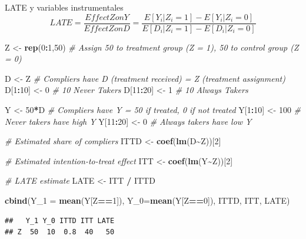 \documentclass[
  ignorenonframetext,
]{beamer}
\newenvironment{Shaded}{\begin{snugshade}}{\end{snugshade}}
\newcommand{\CommentTok}[1]{\textcolor[rgb]{0.56,0.35,0.01}{\textit{#1}}}
\newcommand{\DataTypeTok}[1]{\textcolor[rgb]{0.13,0.29,0.53}{#1}}
\newcommand{\DecValTok}[1]{\textcolor[rgb]{0.00,0.00,0.81}{#1}}
\newcommand{\KeywordTok}[1]{\textcolor[rgb]{0.13,0.29,0.53}{\textbf{#1}}}
\newcommand{\NormalTok}[1]{#1}
\newcommand{\OperatorTok}[1]{\textcolor[rgb]{0.81,0.36,0.00}{\textbf{#1}}}
\newcommand{\StringTok}[1]{\textcolor[rgb]{0.31,0.60,0.02}{#1}}
\begin{document}
\begin{frame}[fragile]{LATE y variables instrumentales}
\protect\hypertarget{late-y-variables-instrumentales-1}{}
\[LATE = \frac{EffectZonY}{EffectZonD} = \frac{E[Y_i|Z_i=1]-E[Y_i|Z_i=0]}{E[D_i|Z_i=1]-E[D_i|Z_i=0]}\]
\pause

\tiny

\begin{Shaded}
\begin{Highlighting}[]
\NormalTok{Z \textless{}{-}}\StringTok{ }\KeywordTok{rep}\NormalTok{(}\DecValTok{0}\OperatorTok{:}\DecValTok{1}\NormalTok{,}\DecValTok{50}\NormalTok{) }\CommentTok{\# Assign 50 to treatment group (Z = 1), 50 to control group (Z = 0)}

\NormalTok{D \textless{}{-}}\StringTok{ }\NormalTok{Z           }\CommentTok{\# Compliers have D (treatment received) = Z (treatment assignment)}
\NormalTok{D[}\DecValTok{1}\OperatorTok{:}\DecValTok{10}\NormalTok{]  \textless{}{-}}\StringTok{ }\DecValTok{0}    \CommentTok{\# 10 Never Takers}
\NormalTok{D[}\DecValTok{11}\OperatorTok{:}\DecValTok{20}\NormalTok{] \textless{}{-}}\StringTok{ }\DecValTok{1}    \CommentTok{\# 10 Always Takers}

\NormalTok{Y        \textless{}{-}}\StringTok{ }\DecValTok{50}\OperatorTok{*}\NormalTok{D }\CommentTok{\# Compliers have Y = 50 if treated, 0 if not treated}
\NormalTok{Y[}\DecValTok{1}\OperatorTok{:}\DecValTok{10}\NormalTok{]  \textless{}{-}}\StringTok{ }\DecValTok{100}  \CommentTok{\# Never takers have high Y}
\NormalTok{Y[}\DecValTok{11}\OperatorTok{:}\DecValTok{20}\NormalTok{] \textless{}{-}}\StringTok{ }\DecValTok{0}    \CommentTok{\# Always takers have low Y}


\CommentTok{\# Estimated share of compliers }
\NormalTok{ITTD \textless{}{-}}\StringTok{ }\KeywordTok{coef}\NormalTok{(}\KeywordTok{lm}\NormalTok{(D}\OperatorTok{\textasciitilde{}}\NormalTok{Z))[}\DecValTok{2}\NormalTok{] }

\CommentTok{\# Estimated intention{-}to{-}treat effect}
\NormalTok{ITT  \textless{}{-}}\StringTok{ }\KeywordTok{coef}\NormalTok{(}\KeywordTok{lm}\NormalTok{(Y}\OperatorTok{\textasciitilde{}}\NormalTok{Z))[}\DecValTok{2}\NormalTok{] }

\CommentTok{\# LATE estimate}
\NormalTok{LATE \textless{}{-}}\StringTok{ }\NormalTok{ITT }\OperatorTok{/}\StringTok{ }\NormalTok{ITTD}

\KeywordTok{cbind}\NormalTok{(}\DataTypeTok{Y\_1 =} \KeywordTok{mean}\NormalTok{(Y[Z}\OperatorTok{==}\DecValTok{1}\NormalTok{]), }\DataTypeTok{Y\_0=}\KeywordTok{mean}\NormalTok{(Y[Z}\OperatorTok{==}\DecValTok{0}\NormalTok{]), ITTD, ITT, LATE)}
\end{Highlighting}
\end{Shaded}

\begin{verbatim}
##   Y_1 Y_0 ITTD ITT LATE
## Z  50  10  0.8  40   50
\end{verbatim}
\end{frame}
\end{document}

